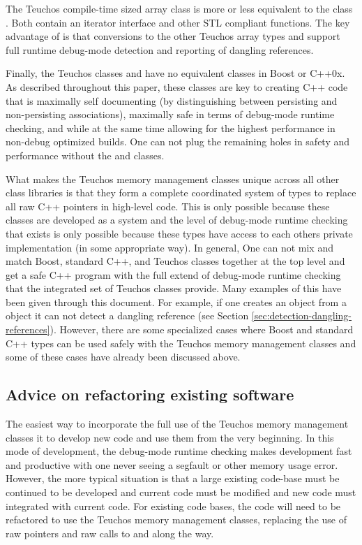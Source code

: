 \documentclass[pdf,ps2pdf,11pt]{SANDreport}
\begin{document}
The Teuchos compile-time sized array class {} is more or
less equivalent to the class {}.  Both contain an
iterator interface and other STL compliant functions.  The key
advantage of {} is that conversions to the other Teuchos
array types {} and {} support full
runtime debug-mode detection and reporting of dangling references.

Finally, the Teuchos classes {} and {} have no
equivalent classes in Boost or C++0x.  As described throughout this
paper, these classes are key to creating C++ code that is maximally
self documenting (by distinguishing between persisting and
non-persisting associations), maximally safe in terms of debug-mode
runtime checking, and while at the same time allowing for the highest
performance in non-debug optimized builds.  One can not plug the
remaining holes in safety and performance without the {} and
{} classes.

What makes the Teuchos memory management classes unique across all
other class libraries is that they form a complete coordinated system
of types to replace all raw C++ pointers in high-level code.  This is
only possible because these classes are developed as a system and the
level of debug-mode runtime checking that exists is only possible
because these types have access to each others private implementation
(in some appropriate way).  In general, One can not mix and match
Boost, standard C++, and Teuchos classes together at the top level and
get a safe C++ program with the full extend of debug-mode runtime
checking that the integrated set of Teuchos classes provide.  Many
examples of this have been given through this document.  For example,
if one creates an {} object from a {}
object it can not detect a dangling reference (see Section
{}\ref{sec:detection-dangling-references}).  However, there are some
specialized cases where Boost and standard C++ types can be used
safely with the Teuchos memory management classes and some of these
cases have already been discussed above.


%
{}\subsection{Advice on refactoring existing software}
%

The easiest way to incorporate the full use of the Teuchos memory
management classes it to develop new code and use them from the very
beginning.  In this mode of development, the debug-mode runtime
checking makes development fast and productive with one never seeing a
segfault or other memory usage error.  However, the more typical
situation is that a large existing code-base must be continued to be
developed and current code must be modified and new code must
integrated with current code.  For existing code bases, the code will
need to be refactored to use the Teuchos memory management classes,
replacing the use of raw pointers and raw calls to {} and
{} along the way.
\end{document}
